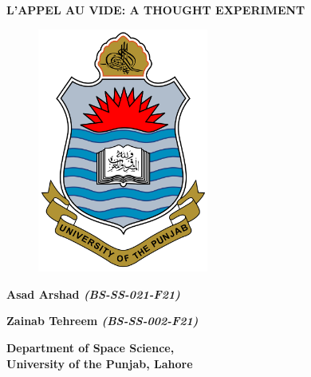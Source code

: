 \documentclass[a4paper, 12pt]{report}
\begin{document}
\begin{titlepage}
    \begin{center}
        \vspace*{1cm}
        
        \large
        \begin{doublespace}
          \textbf{\MakeUppercase{L'appel au Vide: A thought Experiment}}
        \end{doublespace}
        

        \vspace{1cm}
        
        \begin{figure}[h]
          \centering
          \includegraphics[width=0.5\textwidth]{images/pu.png}\label{fig:logo}
        \end{figure}

        \vspace{3cm}
        \large
        \textbf{Asad Arshad \emph{(BS-SS-021-F21)}}

        \textbf{Zainab Tehreem \emph{(BS-SS-002-F21)}}
        
        \vfill
        
        \begin{doublespace}
          
          \large
          \textbf{ }
          \vspace{0.4cm}
          
          \Large
          \textbf{Department of Space Science, \\ University of the Punjab, Lahore}

        \end{doublespace}
        \date{Date of Submission}
        
    \end{center}
\end{titlepage}
\end{document}
